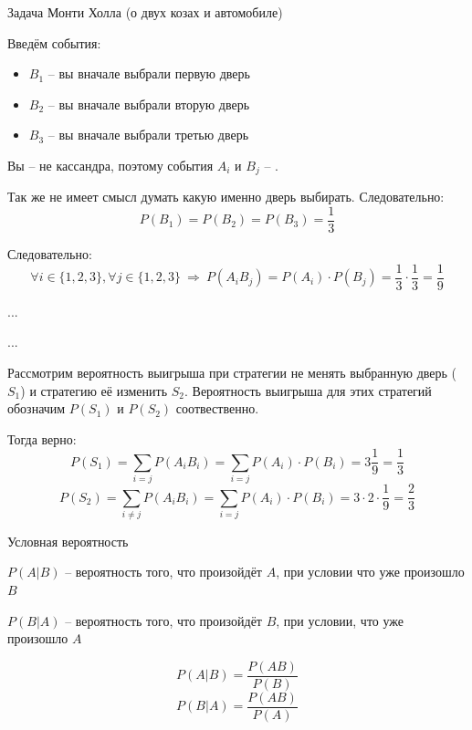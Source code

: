 \begin{frame}{Задача Монти Холла (о двух козах и автомобиле)}

Введём события:
\begin{itemize}
	\item $B_1$ -- вы вначале выбрали первую дверь
	\item $B_2$ -- вы вначале выбрали вторую дверь
	\item $B_3$ -- вы вначале выбрали третью дверь
\end{itemize}

Вы -- не кассандра, поэтому события $A_i$ и $B_j$ -- .


Так же не имеет смысл думать какую именно дверь выбирать.
Следовательно:
\begin{equation}\label{eq:B_pofig}
P(B_1) = P(B_2) = P(B_3) = \frac{1}{3}
\end{equation}

Следовательно:
\begin{equation*}
\forall i \in \{1,2,3\}, \forall j \in \{1,2,3\} ~\Longrightarrow~ P(A_i B_j) = P(A_i) \cdot P(B_j) = \frac{1}{3} \cdot \frac{1}{3}=\frac{1}{9}
\end{equation*}

...
\end{frame}
\begin{frame}
...

Рассмотрим вероятность выигрыша при стратегии не менять выбранную дверь ($S_1$) и стратегию её изменить $S_2$.
Вероятность выигрыша для этих стратегий обозначим $P(S_1)$ и $P(S_2)$ соотвественно.

Тогда верно:
\begin{equation}
P(S_1) =  \sum_{i=j} P(A_i B_i) = \sum_{i=j} P(A_i)\cdot P(B_i) = 3 \frac{1}{9} = \frac{1}{3}
\end{equation}
\begin{equation}
P(S_2) =  \sum_{i \neq j} P(A_i B_i) = \sum_{i=j} P(A_i)\cdot P(B_i) = 3 \cdot 2 \cdot \frac{1}{9} = \frac{2}{3}
\end{equation}

	
\end{frame}


\begin{frame}{Условная вероятность}

$P(A|B)$ -- вероятность того, что произойдёт $A$, при условии что уже произошло $B$

$P(B|A)$ -- вероятность того, что произойдёт $B$, при условии, что уже произошло $A$

\begin{equation}\label{eq:P_A_by_B}
P(A|B) = \frac{P(AB)}{P(B)}
\end{equation}
\begin{equation}\label{eq:P_B_by_A}
P(B|A) = \frac{P(AB)}{P(A)}
\end{equation}

	
\end{frame}

